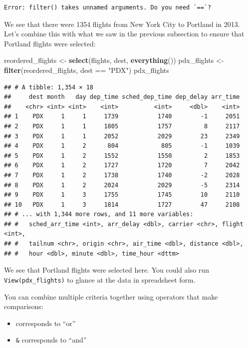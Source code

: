 \documentclass[]{tufte-book}
\newenvironment{Shaded}{\begin{snugshade}}{\end{snugshade}}
\newcommand{\KeywordTok}[1]{\textcolor[rgb]{0.13,0.29,0.53}{\textbf{{#1}}}}
\newcommand{\StringTok}[1]{\textcolor[rgb]{0.31,0.60,0.02}{{#1}}}
\newcommand{\NormalTok}[1]{{#1}}
\providecommand{\tightlist}{%
  \setlength{\itemsep}{0pt}\setlength{\parskip}{0pt}}
\begin{document}
\begin{verbatim}
Error: filter() takes unnamed arguments. Do you need `==`?
\end{verbatim}

We see that there were 1354 flights from New York City to Portland in
2013. Let's combine this with what we saw in the previous subsection to
ensure that Portland flights were selected:

\begin{Shaded}
\begin{Highlighting}[]
\NormalTok{reordered_flights <-}\StringTok{ }\KeywordTok{select}\NormalTok{(flights, dest, }\KeywordTok{everything}\NormalTok{())}
\NormalTok{pdx_flights <-}\StringTok{ }\KeywordTok{filter}\NormalTok{(reordered_flights, dest ==}\StringTok{ "PDX"}\NormalTok{)}
\NormalTok{pdx_flights}
\end{Highlighting}
\end{Shaded}

\begin{verbatim}
## # A tibble: 1,354 × 18
##     dest month   day dep_time sched_dep_time dep_delay arr_time
##    <chr> <int> <int>    <int>          <int>     <dbl>    <int>
## 1    PDX     1     1     1739           1740        -1     2051
## 2    PDX     1     1     1805           1757         8     2117
## 3    PDX     1     1     2052           2029        23     2349
## 4    PDX     1     2      804            805        -1     1039
## 5    PDX     1     2     1552           1550         2     1853
## 6    PDX     1     2     1727           1720         7     2042
## 7    PDX     1     2     1738           1740        -2     2028
## 8    PDX     1     2     2024           2029        -5     2314
## 9    PDX     1     3     1755           1745        10     2110
## 10   PDX     1     3     1814           1727        47     2108
## # ... with 1,344 more rows, and 11 more variables:
## #   sched_arr_time <int>, arr_delay <dbl>, carrier <chr>, flight <int>,
## #   tailnum <chr>, origin <chr>, air_time <dbl>, distance <dbl>,
## #   hour <dbl>, minute <dbl>, time_hour <dttm>
\end{verbatim}

We see that Portland flights were selected here. You could also run
\texttt{View(pdx\_flights)} to glance at the data in spreadsheet form.

You can combine multiple criteria together using operators that make
comparisons:

\begin{itemize}
\tightlist
\item
  \texttt{\textbar{}} corresponds to ``or''
\item
  \texttt{\&} corresponds to ``and''
\end{itemize}
\end{document}
